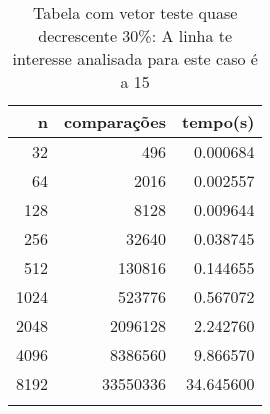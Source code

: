 \begin{table}[ht]
\centering
\begin{tabular}{rrr} \toprule
        n &    comparações &       tempo(s) \\ \midrule
      32  &            496 &      0.000684 \\
      64  &           2016 &      0.002557 \\
     128  &           8128 &      0.009644 \\
     256  &          32640 &      0.038745 \\
     512  &         130816 &      0.144655 \\
    1024  &         523776 &      0.567072 \\
    2048  &        2096128 &      2.242760 \\
    4096  &        8386560 &      9.866570 \\
    8192  &       33550336 &     34.645600 \\
\bottomrule\addlinespace
\end{tabular}
\caption{Tabela com vetor teste quase decrescente 30\%: A linha te interesse analisada para este caso é a 15}
\label{tab:selectionsortQuaseDecresc30}
\end{table}
